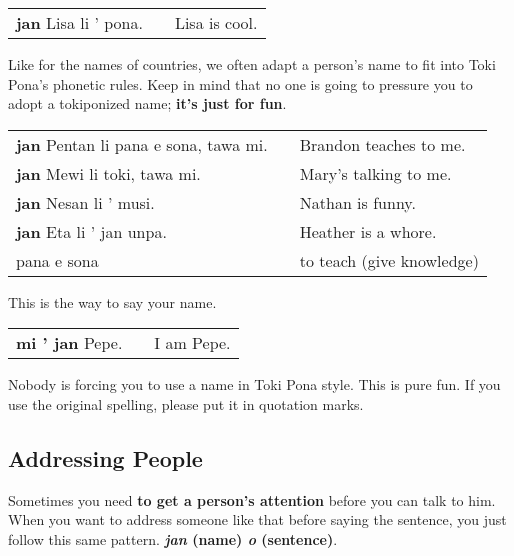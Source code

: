 \begin{supertabular}{p{5,5cm}|ll}
\textbf{jan} Lisa li ' pona. && Lisa is cool. \\
\end{supertabular} 

Like for the names of countries, we often adapt a person's name to fit into Toki Pona's phonetic rules. 
Keep in mind that no one is going to pressure you to adopt a tokiponized name; \textbf{it's just for fun}. 

\begin{supertabular}{p{5,5cm}|ll}
\textbf{jan} Pentan li pana e sona, tawa mi. && Brandon teaches to me. \\
\textbf{jan} Mewi li toki, tawa mi. && Mary's talking to me. \\
\textbf{jan} Nesan li ' musi. && Nathan is funny. \\
\textbf{jan} Eta li ' jan unpa. && Heather is a whore. \\
pana e sona && to teach (give knowledge) \\
\end{supertabular} 

This is the way to say your name. 

\begin{supertabular}{p{5,5cm}|ll}
\textbf{mi ' jan} Pepe. && I am Pepe. \\
\end{supertabular} 

Nobody is forcing you to use a name in Toki Pona style.
This is pure fun.
If you use the original spelling, please put it in quotation marks.
%
\subsection*{Addressing People}
%
Sometimes you need \textbf{to get a person's attention} before you can talk to him. 
When you want to address someone like that before saying the sentence, you just follow this same pattern. 
\textbf{\textit{jan} (name) \textit{o} (sentence)}. 

